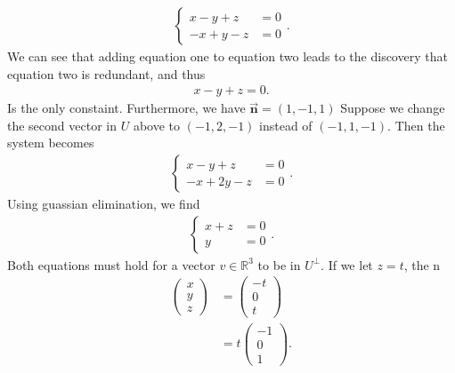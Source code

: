 \documentclass{report}
\begin{document}
\begin{itemize}
\begin{align*}
               \begin{cases}
                   x -y + z &= 0 \\
                   -x + y - z &= 0
               \end{cases}
            .\end{align*}
            We can see that adding equation one to equation two leads to the discovery that equation two is redundant, and thus 
            \begin{align*}
                x -y + z = 0
            .\end{align*}
            Is the only constaint. Furthermore, we have $\vec{\mathbf{n}} = (1,-1,1)$
            \bigbreak \noindent 
            Suppose we change the second vector in $U$ above to $(-1,2,-1)$ instead of $(-1,1,-1)$. Then the system becomes
            \begin{align*}
                \begin{cases}
                    x -y  + z &= 0  \\
                    -x + 2y - z &= 0
                \end{cases}
            .\end{align*}
            Using guassian elimination, we find
            \begin{align*}
                \begin{cases}
                    x + z &=0 \\
                    y &= 0
                \end{cases}
            .\end{align*}
            Both equations must hold for a vector $v\in \mathbb{R}^{3}$ to be in $U^{\perp}$. If we let $z=t$, the n
            \begin{align*}
                \begin{pmatrix} x \\ y \\ z \end{pmatrix} &= \begin{pmatrix} -t \\ 0 \\ t\end{pmatrix} \\
                                                          &= t \begin{pmatrix} -1 \\ 0 \\ 1 \end{pmatrix}
            .\end{align*}

\end{itemize}
\end{document}
